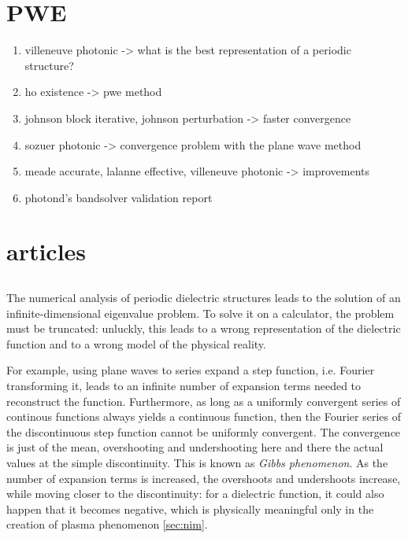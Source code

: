 \section{PWE}
\label{sec:pwe}

\begin{enumerate}
\item
  villeneuve photonic -> what is the best representation of a periodic structure?
\item
  ho existence -> pwe method
\item
  johnson block iterative, johnson perturbation -> faster convergence
\item
  sozuer photonic -> convergence problem with the plane wave method
\item
  meade accurate, lalanne effective, villeneuve photonic -> improvements
\item
  photond's bandsolver validation report
\end{enumerate}

\section{articles}

\subsection{\cite{villeneuve_photonic}}

The numerical analysis of periodic dielectric structures leads to the
solution of an infinite-dimensional eigenvalue problem. To solve it on
a calculator, the problem must be truncated: unluckly, this leads to a
wrong representation of the dielectric function and to a wrong model
of the physical reality.


For example, using plane waves to series expand a step function,
i.e. Fourier transforming it, leads to an infinite number of expansion
terms needed to reconstruct the function. Furthermore, as long as a
uniformly convergent series of continous functions always yields a
continuous function, then the Fourier series of the discontinuous
step function cannot be uniformly convergent. The convergence is just
of the mean, overshooting and undershooting here and there the actual
values at the simple discontinuity. This is known as \emph{Gibbs
  phenomenon}. As the number of expansion terms is increased, the
overshoots and undershoots increase, while moving closer to the
discontinuity: for a dielectric function, it could also happen that it
becomes negative, which is physically meaningful only in the creation
of plasma phenomenon \ref{sec:nim}.

